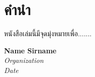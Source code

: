 \chapter*{คำนำ}

หนังสือเล่มนี้มีจุดมุ่งหมายเพื่อ.......

\begin{flushright}
\textbf{Name Sirname} \\
\textit{Organization} \\
\textit{Date}
\end{flushright}